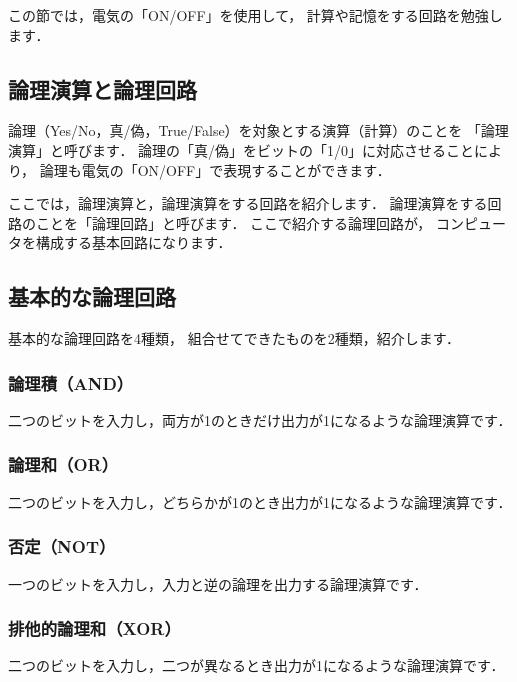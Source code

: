 この節では，電気の「ON/OFF」を使用して，
計算や記憶をする回路を勉強します．

\subsection{論理演算と論理回路}
\label{logical}

論理（Yes/No，真/偽，True/False）を対象とする演算（計算）のことを
「論理演算」と呼びます．
論理の「真/偽」をビットの「1/0」に対応させることにより，
論理も電気の「ON/OFF」で表現することができます．

ここでは，論理演算と，論理演算をする回路を紹介します．
論理演算をする回路のことを「論理回路」と呼びます．
ここで紹介する論理回路が，
コンピュータを構成する基本回路になります．

\subsection{基本的な論理回路}
基本的な論理回路を4種類，
組合せてできたものを2種類，紹介します．

\subsubsection{論理積（AND）}
二つのビットを入力し，両方が1のときだけ出力が1になるような論理演算です．
\begin{center}
\end{center}

\subsubsection{論理和（OR）}
二つのビットを入力し，どちらかが1のとき出力が1になるような論理演算です．
\begin{center}
\end{center}

\subsubsection{否定（NOT）}
一つのビットを入力し，入力と逆の論理を出力する論理演算です．
\begin{center}
\end{center}

\subsubsection{排他的論理和（XOR）}
二つのビットを入力し，二つが異なるとき出力が1になるような論理演算です．
\begin{center}
\end{center}

